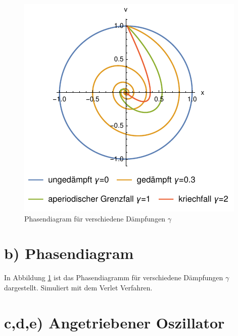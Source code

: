 \begin{figure}
	\centering
	\includegraphics[width=\linewidth]{B_Phase.pdf}
	\caption{Phasendiagram für verschiedene Dämpfungen $\gamma$}
	\label{fig:phase}
\end{figure}

\section*{b) Phasendiagram}
In Abbildung \ref{fig:phase} ist das Phasendiagramm für verschiedene Dämpfungen $\gamma$ dargestellt. Simuliert mit dem Verlet Verfahren.



\section*{c,d,e) Angetriebener Oszillator}
\blindtext

